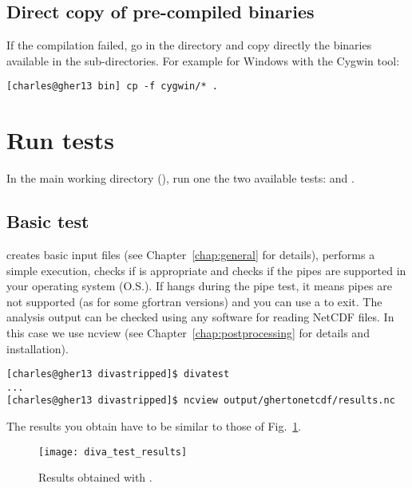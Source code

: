 \subsection{Direct copy of pre-compiled binaries}

If the compilation failed, go in the  directory and copy directly the binaries available in the sub-directories. For example for Windows with the Cygwin tool:
\begin{lstlisting}[style=Bash]
[charles@gher13 bin] cp -f cygwin/* .
\end{lstlisting}

\section{Run tests\label{sec:divatest}}

In the main working directory (), run one the two available tests:  and . 


\subsection{Basic test}


 creates basic input files (see Chapter~\ref{chap:general} for details), performs a simple \diva execution, checks if  is appropriate and checks if the pipes are supported in your operating system (O.S.). If  hangs during the pipe test, it means pipes are not supported (as for some gfortran versions) and you can use a  to exit. The analysis output can be checked using any software for reading NetCDF files. In this case we use ncview (see Chapter~\ref{chap:postprocessing} for details and installation). 

\begin{lstlisting}[style=Bash]
[charles@gher13 divastripped]$ divatest
...
[charles@gher13 divastripped]$ ncview output/ghertonetcdf/results.nc
\end{lstlisting}
The results you obtain have to be similar to those of Fig.~\ref{fig:diva_test_results}.

\begin{figure}[H]
\centering 
\texttt{[image: diva\_test\_results]}
\caption{Results obtained with .\label{fig:diva_test_results}}
\end{figure}


